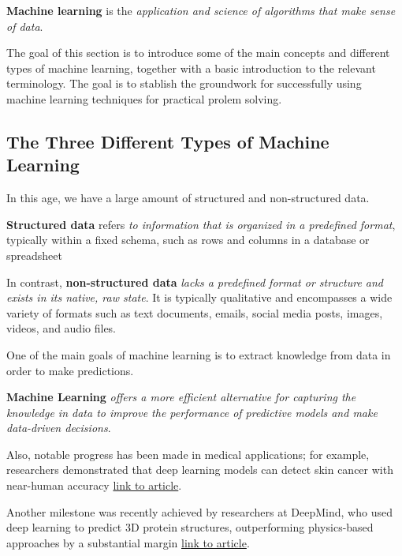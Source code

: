\documentclass[../machine_learning_scikit.tex]{subfiles}
\begin{document}
    \begin{mydef}
        \textbf{Machine learning} is the\textit{ application and science of algorithms that make sense of data}.
    \end{mydef}

    The goal of this section is to introduce some of the main concepts and different types of machine learning, together with a basic introduction to the relevant terminology. The goal is to stablish the groundwork for successfully using machine learning techniques for practical prolem solving.

    \subsection{The Three Different Types of Machine Learning}

    In this age, we have a large amount of structured and non-structured data.

    \begin{mydef}
        \textbf{Structured data} refers \textit{to information that is organized in a predefined format}, typically within a fixed schema, such as rows and columns in a database or spreadsheet

        In contrast, \textbf{non-structured data} \textit{lacks a predefined format or structure and exists in its native, raw state}. It is typically qualitative and encompasses a wide variety of formats such as text documents, emails, social media posts, images, videos, and audio files.
    \end{mydef}

    One of the main goals of machine learning is to extract knowledge from data in order to make predictions.

    \begin{obs}
        \textbf{Machine Learning} \textit{offers a more efficient alternative for capturing the knowledge in data to improve the performance of predictive models and make data-driven decisions}.
    \end{obs}
    
    \begin{idea}
        Also, notable progress has been made in medical applications; for example, researchers demonstrated that deep learning models can detect skin cancer with near-human accuracy \href{https://www.nature.com/articles/nature21056}{link to article}.
        
        Another milestone was recently achieved by researchers at DeepMind, who used deep learning to predict 3D protein structures, outperforming physics-based approaches by a substantial margin \href{https://deepmind.com/blog/article/alphafold-a-solution-to-a-50-year-old-grand-challenge-in-biology}{link to article}.  
    \end{idea}
    
\end{document}
